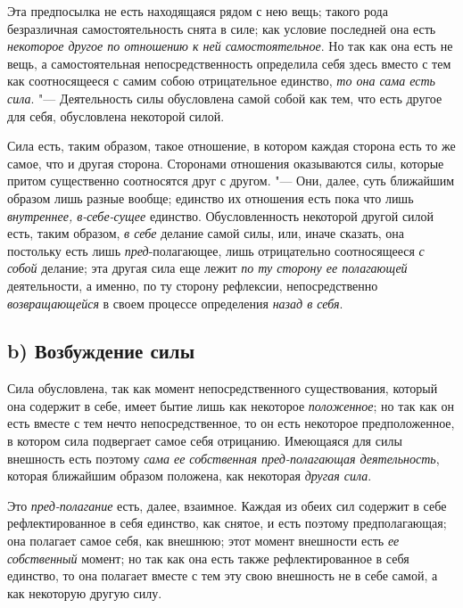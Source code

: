 Эта предпосылка не есть находящаяся рядом с нею вещь; такого рода
безразличная самостоятельность снята в силе; как условие последней она есть
{\em некоторое другое по отношению к ней
самостоятельное}. Но так как она есть не вещь, а самостоятельная
непосредственность определила себя здесь вместо с тем как соотносящееся с
самим собою отрицательное единство, {\em то она сама
есть сила}. "--- Деятельность силы обусловлена самой собой как тем, что есть
другое для себя, обусловлена некоторой силой.

Сила есть, таким образом, такое отношение, в котором каждая сторона есть то
же самое, что и другая сторона. Сторонами отношения оказываются силы,
которые притом существенно соотносятся друг с другом. "--- Они, далее, суть
ближайшим образом лишь разные вообще; единство их отношения есть пока что
лишь {\em внутреннее, в-себе-сущее} единство.
Обусловленность некоторой другой силой есть, таким образом,
{\em в себе} делание самой силы, или, иначе сказать,
она постольку есть лишь {\em пред}{}-полагающее, лишь
отрицательно соотносящееся {\em с собой} делание; эта
другая сила еще лежит {\em по ту сторону ее полагающей}
деятельности, а именно, по ту сторону рефлексии, непосредственно
{\em возвращающейся} в своем процессе определения
{\em назад в себя}.


\subsection[b) Возбуждение силы]{b) Возбуждение силы}

Сила обусловлена, так как момент
непосредственного существования, который она содержит в себе, имеет бытие
лишь как некоторое {\em положенное}; но так как он есть
вместе с тем нечто непосредственное, то он есть некоторое предположенное, в
котором сила подвергает самое себя отрицанию. Имеющаяся для силы внешность
есть поэтому {\em сама ее собственная пред-полагающая
деятельность}, которая ближайшим образом положена, как некоторая
{\em другая сила}.

Это {\em пред-полагание} есть, далее, взаимное. Каждая
из обеих сил содержит в себе рефлектированное в себя единство, как снятое,
и есть поэтому предполагающая; она полагает самое себя, как внешнюю; этот
момент внешности есть {\em ее собственный} момент; но
так как она есть также рефлектированное в себя единство, то она полагает
вместе с тем эту свою внешность не в себе самой, а как некоторую другую силу.

